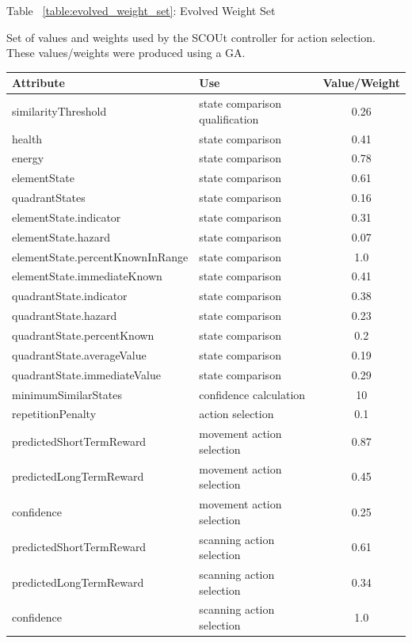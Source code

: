 \begin{center}
  \label{table:evolved_weight_set}
  \caption{Table ~\ref{table:evolved_weight_set}: Evolved Weight Set}
  \caption{Set of values and weights used by the SCOUt controller for action selection. These values/weights were produced using a GA.}
  \begin{tabular}{ l l c }
    \textbf{Attribute}                & \textbf{Use}                    & \textbf{Value/Weight} \\
    \hline
    similarityThreshold               & state comparison qualification  & 0.26  \\
    health                            & state comparison                & 0.41  \\
    energy                            & state comparison                & 0.78  \\
    elementState                      & state comparison                & 0.61  \\
    quadrantStates                    & state comparison                & 0.16  \\
    elementState.indicator            & state comparison                & 0.31  \\
    elementState.hazard               & state comparison                & 0.07  \\
    elementState.percentKnownInRange  & state comparison                & 1.0   \\
    elementState.immediateKnown       & state comparison                & 0.41  \\
    quadrantState.indicator           & state comparison                & 0.38  \\
    quadrantState.hazard              & state comparison                & 0.23  \\
    quadrantState.percentKnown        & state comparison                & 0.2   \\
    quadrantState.averageValue        & state comparison                & 0.19  \\
    quadrantState.immediateValue      & state comparison                & 0.29  \\
    minimumSimilarStates              & confidence calculation          & 10    \\
    repetitionPenalty                 & action selection                & 0.1   \\
    predictedShortTermReward          & movement action selection       & 0.87  \\
    predictedLongTermReward           & movement action selection       & 0.45  \\
    confidence                        & movement action selection       & 0.25  \\
    predictedShortTermReward          & scanning action selection       & 0.61  \\
    predictedLongTermReward           & scanning action selection       & 0.34  \\
    confidence                        & scanning action selection       & 1.0   \\
    \hline
  \end{tabular}
\end{center}


